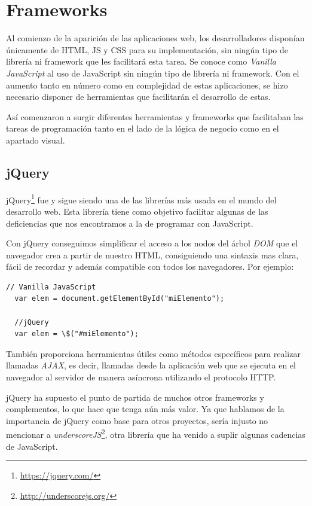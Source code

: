 \section{Frameworks}

Al comienzo de la aparición de las aplicaciones web, los desarrolladores disponían únicamente de \gls{HTML}, \gls{JS} y \gls{CSS} para su implementación, sin ningún tipo de librería ni framework que les facilitará esta tarea. Se conoce como \emph{Vanilla JavaScript} al uso de JavaScript sin ningún tipo de librería ni framework. Con el aumento tanto en número como en complejidad de estas aplicaciones, se hizo necesario disponer de herramientas que facilitarán el desarrollo de estas.

Así comenzaron a surgir diferentes herramientas y frameworks que facilitaban las tareas de programación tanto en el lado de la lógica de negocio como en el apartado visual.

\subsection{jQuery}

jQuery\footnote{\url{https://jquery.com/}} fue y sigue siendo una de las librerías más usada en el mundo del desarrollo web. Esta librería tiene como objetivo facilitar algunas de las deficiencias que nos encontramos a la de programar con JavaScript.

Con jQuery conseguimos simplificar el acceso a los nodos del árbol \emph{DOM} que el navegador crea a partir de nuestro \gls{HTML}, consiguiendo una sintaxis mas clara, fácil de recordar y además compatible con todos los navegadores. Por ejemplo:

\begin{lstlisting}[style=htmlcssjs,frame=tlrb,xleftmargin={0.2cm}]
  // Vanilla JavaScript
  var elem = document.getElementById("miElemento");

  //jQuery
  var elem = \$("#miElemento");
\end{lstlisting}

También proporciona herramientas útiles como métodos específicos para realizar llamadas \emph{AJAX}, es decir, llamadas desde la aplicación web que se ejecuta en el navegador al servidor de manera asíncrona utilizando el protocolo \gls{HTTP}.

jQuery ha supuesto el punto de partida de muchos otros frameworks y complementos, lo que hace que tenga aún más valor. Ya que hablamos de la importancia de jQuery como base para otros proyectos, sería injusto no mencionar a \emph{underscoreJS}\footnote{\url{http://underscorejs.org/}}, otra librería que ha venido a suplir algunas cadencias de JavaScript.

